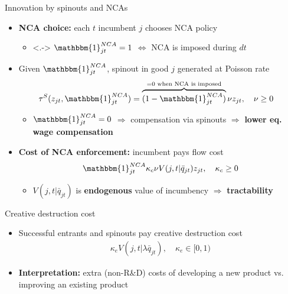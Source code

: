 \documentclass[english,usenames,dvipsnames,handout]{beamer}
\begin{document}
\begin{frame}{Innovation by spinouts and NCAs}
	\begin{itemize}
		\item<+-> \alert{\textbf{NCA choice:}} each $t$ incumbent $j$ chooses NCA policy
		\begin{itemize}
			\item<.-> $\mathbbm{1}^{NCA}_{jt} = 1$ $\Leftrightarrow$ NCA is imposed during $dt$
		\end{itemize}
		\medskip
		\item<+-> Given $\mathbbm{1}^{NCA}_{jt}$, spinout in good $j$ generated at Poisson rate
		\begin{align*}
		\tau^S(z_{jt},\mathbbm{1}^{NCA}_{jt}) &= \overbrace{(1-\mathbbm{1}_{jt}^{NCA})}^{\mathclap{= 0 \text{ when NCA is imposed}}} \nu z_{jt}, \quad \nu \ge 0
		\end{align*}
		\begin{itemize}
			\item<+-> $\mathbbm{1}^{NCA}_{jt} = 0$ $\Rightarrow$ compensation via spinouts $\Rightarrow$ \alert{\textbf{lower eq. wage compensation}}
		\end{itemize}
		\medskip
		\item<+-> \alert{\textbf{Cost of NCA enforcement:}} incumbent pays flow cost 
		\begin{align*}
			\mathbbm{1}^{NCA}_{jt} \kappa_c \nu V(j,t | \bar{q}_{jt}) z_{jt}, \quad \kappa_c \ge 0
		\end{align*} 
		\begin{itemize}
			\item<+-> $V(j,t|\bar{q}_{jt})$ is \alert{\textbf{endogenous}} value of incumbency $\Rightarrow$ \alert{\textbf{tractability}} 
		\end{itemize}
	\end{itemize}
\end{frame}

\begin{frame}{Creative destruction cost}
	\begin{itemize}
		\item Successful entrants and spinouts pay creative destruction cost
		\begin{align*}
			\kappa_e V(j,t|\lambda \bar{q}_{jt}), \quad \kappa_e \in [0,1)
		\end{align*}
		\item \alert{\textbf{Interpretation:}} extra (non-R\&D) costs of developing a new product vs. improving an existing product
	\end{itemize}
\end{frame}
\end{document}
